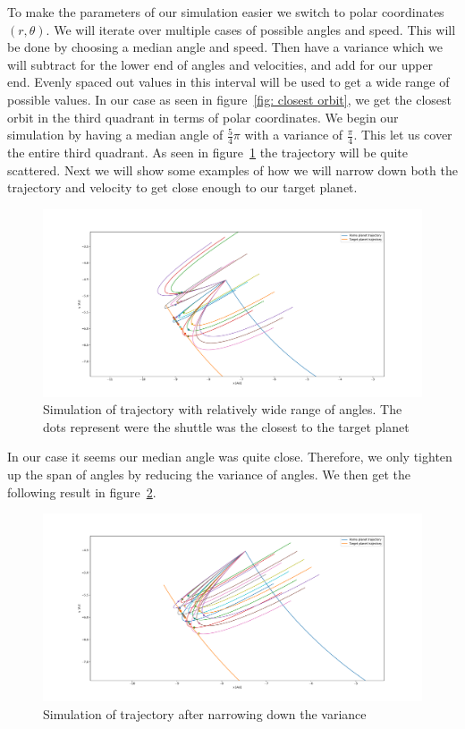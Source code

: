 \documentclass[reprint,english,notitlepage]{revtex4-2}
\begin{document}
To make the parameters of our simulation easier we switch to polar coordinates $ (r, \theta) $.
We will iterate over multiple cases of possible angles and speed.
This will be done by choosing a median angle and speed.
Then have a variance which we will subtract for the lower end of angles and velocities, and add for our upper end.
Evenly spaced out values in this interval will be used to get a wide range of possible values.
In our case as seen in figure~\ref{fig: closest orbit}, we get the closest orbit in the third quadrant in terms of polar coordinates.
We begin our simulation by having a median angle of $ \frac{5}{4}\pi $ with a variance of $ \frac{\pi}{4} $.
This let us cover the entire third quadrant.
As seen in figure~\ref{fig: simulation scattered} the trajectory will be quite scattered.
Next we will show some examples of how we will narrow down both the trajectory and velocity to get close enough to our target planet.

\begin{figure}[h!]
  \centering
  \includegraphics[scale = .125]{Figures/full_angle_scatter}
  \caption{Simulation of trajectory with relatively wide range of angles. The dots represent were the shuttle was the closest to the target planet }
  \label{fig: simulation scattered}
\end{figure}
In our case it seems our median angle was quite close.
Therefore, we only tighten up the span of angles by reducing the variance of angles.
We then get the following result in figure~\ref{fig: simulation tighter}.

\begin{figure}[h!]
  \centering
  \includegraphics[scale = .125]{Figures/narrowing_down_angle}
  \caption{Simulation of trajectory after narrowing down the variance}
  \label{fig: simulation tighter}
\end{figure}
\end{document}
